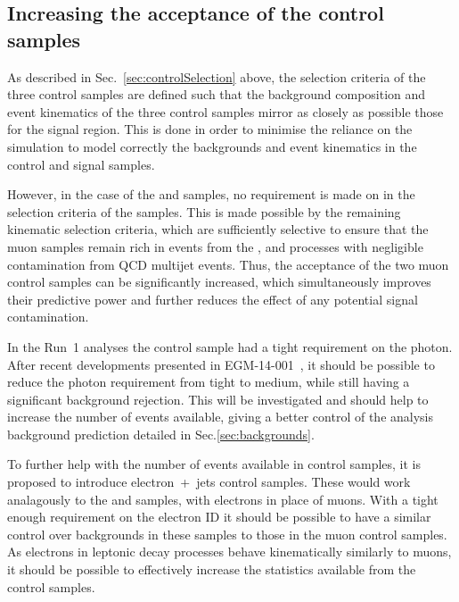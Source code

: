 \subsection{Increasing the acceptance of the control samples\label{sec:larger}}

As described in Sec.~\ref{sec:controlSelection} above, the
selection criteria of the three control samples are defined such that
the background composition and event kinematics of the three control
samples mirror as closely as possible those for the signal
region. This is done in order to minimise the reliance on the
simulation to model correctly the backgrounds and event kinematics in
the control and signal samples.

However, in the case of the \mj and \mmj samples, no requirement is
made on \alphat in the selection criteria of the samples. This is made
possible by the remaining kinematic selection criteria, which are
sufficiently selective to ensure that the muon samples remain rich in
events from the \wj, \ttbar and \zmumu processes with negligible
contamination from QCD multijet events. Thus, the acceptance of the two 
muon control samples can be significantly increased, which simultaneously 
improves their predictive power and further reduces the effect of any potential
signal contamination. 

In the Run~1 analyses the \gj control sample had a tight requirement on the
photon. After recent developments presented in EGM-14-001~\cite{EGM-14-001}, it
should be possible to reduce the photon requirement from tight to medium, while
still having a significant background rejection. This will be investigated and
should help to increase the number of events available, giving a better control
of the analysis background prediction detailed in Sec.\ref{sec:backgrounds}.

To further help with the number of events available in control samples, it is
proposed to introduce electron~+~jets control samples. These would work
analagously to the \mj and \mjj samples, with electrons in place of muons. With
a tight enough requirement on the electron ID it should be possible to have a
similar control over backgrounds in these samples to those in the muon control
samples. As electrons in leptonic decay processes behave kinematically similarly
to muons, it should be possible to effectively increase the statistics available
from the control samples. 
